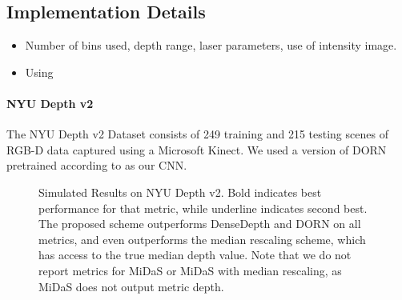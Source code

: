 \subsection{Implementation Details}
\begin{itemize}
  \item Number of bins used, depth range, laser parameters, use of intensity
    image.
  \item Using
\end{itemize}
\paragraph{NYU Depth v2}
The NYU Depth v2 Dataset consists of 249 training and 215 testing scenes of
RGB-D data captured using a Microsoft Kinect. We used a version of DORN
pretrained according to \cite{Fu2018} as our CNN.
\newpage
\begin{figure*}[!t]
\begin{center}

\caption{Simulated Results on NYU Depth v2. Bold indicates best performance for
  that metric, while underline indicates second best. The proposed scheme
  outperforms DenseDepth and DORN on all metrics, and even outperforms the
  median rescaling scheme, which has access to the true median depth value. Note
that we do not report metrics for MiDaS or MiDaS with median rescaling, as MiDaS
does not output metric depth.}
\end{center}
\end{figure*}


